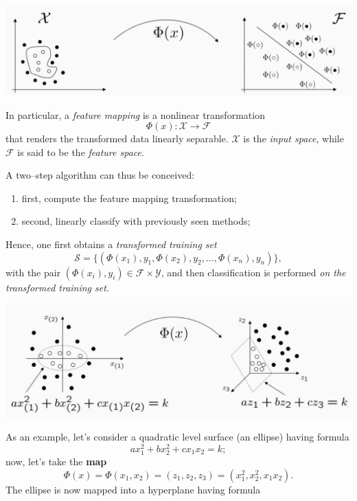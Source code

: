 \documentclass[10pt]{report}
\begin{document}
\begin{center}
\includegraphics[width=.9\linewidth]{./pics/svm/svm-non-linear.jpg}
\end{center}

In particular, a \emph{feature mapping} is a nonlinear transformation $$\Phi(x) :
\mathcal X \longrightarrow \mathcal F$$ that renders the transformed data
linearly separable. \(\mathcal X\) is the \emph{input space}, while \(\mathcal F\) is
said to be the \emph{feature space}.

A two--step algorithm can thus be conceived:

\begin{enumerate}
\item first, compute the feature mapping transformation;
\item second, linearly classify with previously seen methods;
\end{enumerate}

Hence, one first obtains a \emph{transformed training set} $$\mathcal S =
\{(\Phi(x_1), y_1, \Phi(x_2), y_2, \dots, \Phi(x_n), y_n)\},$$ with the pair
\((\Phi(x_i), y_i) \in \mathcal F \times \mathcal Y\), and then classification is
performed \emph{on the transformed training set}.

\begin{center}
\includegraphics[width=.9\linewidth]{./pics/svm/example-ellipses-kt.jpg}
\end{center}

As an example, let's consider a quadratic level surface (an ellipse) having formula
$$ax_1^2 + bx_2^2 + cx_1x_2 = k;$$ now, let's take the \textbf{map} $$\Phi(x) =
\Phi(x_1, x_2) = (z_1, z_2, z_3) = (x_1^2, x_2^2, x_1x_2).$$ The ellipse is now
mapped into a hyperplane having formula
\end{document}
